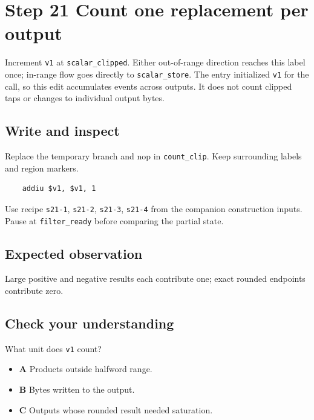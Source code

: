 \section{Step 21 Count one replacement per output}\label{fir-s21}

Increment \texttt{v1} at \texttt{scalar\_clipped}. Either out-of-range direction reaches this label once; in-range flow goes directly to \texttt{scalar\_store}. The entry initialized \texttt{v1} for the call, so this edit accumulates events across outputs. It does not count clipped taps or changes to individual output bytes.

\subsection{Write and inspect}
Replace the temporary branch and nop in \texttt{count\_clip}. Keep surrounding labels and region markers.

\begin{verbatim}
    addiu $v1, $v1, 1
\end{verbatim}
Use recipe \texttt{s21-1}, \texttt{s21-2}, \texttt{s21-3}, \texttt{s21-4} from the companion construction inputs. Pause at \texttt{filter\_ready} before comparing the partial state.

\subsection{Expected observation}
Large positive and negative results each contribute one; exact rounded endpoints contribute zero.

\subsection{Check your understanding}
What unit does \texttt{v1} count?

\begin{itemize}
\item \textbf{A} Products outside halfword range.
\item \textbf{B} Bytes written to the output.
\item \textbf{C} Outputs whose rounded result needed saturation.
\end{itemize}
